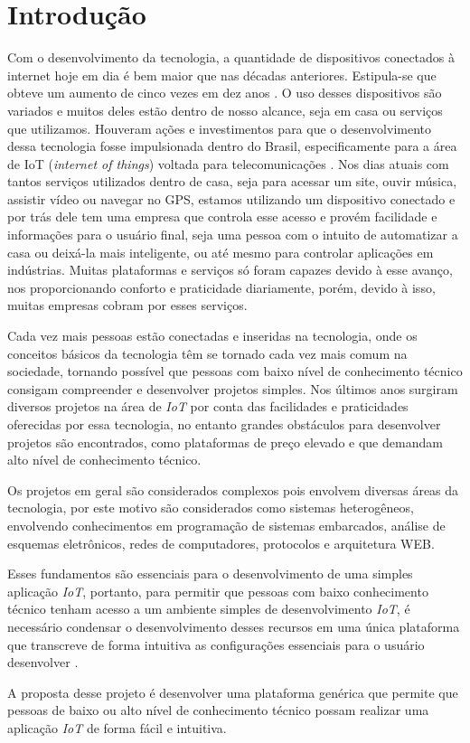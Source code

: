 \documentclass[../../layout.tex]{subfiles}
\begin{document}
\chapter{Introdução}
Com o desenvolvimento da tecnologia, a quantidade de dispositivos conectados à internet hoje em dia é bem maior que nas décadas anteriores. Estipula-se que obteve um aumento de cinco vezes em dez anos \cite{conectdevicesnum}. O uso desses dispositivos são variados e muitos deles estão dentro de nosso alcance, seja em casa ou serviços que utilizamos. Houveram ações e investimentos para que o desenvolvimento dessa tecnologia fosse impulsionada dentro do Brasil, especificamente para a área de IoT (\emph{internet of things}) voltada para telecomunicações \cite{iotinvest}. Nos dias atuais com tantos serviços utilizados dentro de casa, seja para acessar um site, ouvir música, assistir vídeo ou navegar no GPS, estamos utilizando um dispositivo conectado e por trás dele tem uma empresa que controla esse acesso e provém facilidade e informações para o usuário final, seja uma pessoa com o intuito de automatizar a casa ou deixá-la mais inteligente, ou até mesmo para controlar aplicações em indústrias. Muitas plataformas e serviços só foram capazes devido à esse avanço, nos proporcionando conforto e praticidade diariamente, porém, devido à isso, muitas empresas cobram por esses serviços.\par
Cada vez mais pessoas estão conectadas e inseridas na tecnologia, onde os conceitos básicos da tecnologia têm se tornado cada vez mais comum na sociedade, tornando possível que pessoas com baixo nível de conhecimento técnico consigam compreender e desenvolver projetos simples. Nos últimos anos surgiram diversos projetos na área de \emph{IoT} por conta das facilidades e praticidades oferecidas por essa tecnologia, no entanto grandes obstáculos para desenvolver projetos são encontrados, como plataformas de preço elevado e que demandam alto nível de conhecimento técnico.\par
Os projetos em geral são considerados complexos pois envolvem diversas áreas da tecnologia, por este motivo são considerados como sistemas heterogêneos, envolvendo conhecimentos em programação de sistemas embarcados, análise de esquemas eletrônicos, redes de computadores, protocolos e arquitetura WEB.\par
Esses fundamentos são essenciais para o desenvolvimento de uma simples aplicação \emph{IoT}, portanto, para permitir que pessoas com baixo conhecimento técnico tenham acesso a um ambiente simples de desenvolvimento \emph{IoT}, é necessário condensar o desenvolvimento desses recursos em uma única plataforma que transcreve de forma intuitiva as configurações essenciais para o usuário desenvolver \cite{IoTeveryone}.\par
A proposta desse projeto é desenvolver uma plataforma genérica que permite que pessoas de baixo ou alto nível de conhecimento técnico possam realizar uma aplicação \emph{IoT} de forma fácil e intuitiva.
\end{document}
